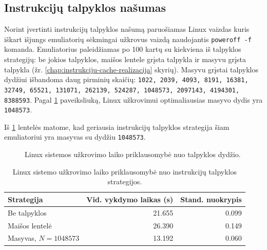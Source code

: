 \subsection{Instrukcijų talpyklos našumas}
\label{chap:cache-nasumas}

Norint įvertinti instrukcijų talpyklos našumą paruošiamas Linux vaizdas kuris iškart išjungs emuliatorių sėkmingai užkrovus vaizdą naudojantis \texttt{poweroff -f} komanda. Emuliatorius paleidžiamas po 100 kartų su kiekviena iš talpyklos strategijų: be jokios talpyklos, maišos lentele grįsta talpykla ir masyvu grįsta talpykla (žr. \ref{chap:instrukciju-cache-realizacija} skyrių). Masyvu grįstai talpyklos dydžiui išbandoma daug pirminių skaičių:
\texttt{1022, 2039, 4093, 8191, 16381, 32749, 65521, 131071, 262139, 524287, 1048573, 2097143, 4194301, 8388593}. Pagal \ref{fig:cache-dydis} paveiksliuką, Linux užkrovimui optimaliausias masyvo dydis yra \texttt{1048573}.

Iš \ref{tbl:instrukciju-cache} lentelės matome, kad geriausia instrukcijų talpyklos strategija šiam emuliatoriui yra masyvas su dydžiu \texttt{1048573}.

\begin{figure}[h]
    
    \caption{Linux sistemos užkrovimo laiko priklausomybė nuo talpyklos dydžio.}
    \label{fig:cache-dydis}
\end{figure}

\begin{table}[h]
\centering
\begin{tabular}{|l|r|r|}
  \hline
    \textbf{Strategija} & \textbf{Vid. vykdymo laikas (s)} & \textbf{Stand. nuokrypis}  \\

  \hline
Be talpyklos & 21.655 & 0.099 \\
\hline
Maišos lentelė & 26.390 & 0.149 \\
\hline
Masyvas, $N = 1048573$ & 13.192 & 0.060 \\
  \hline
\end{tabular}
    \caption{Linux sistemo užkrovimo laiko priklausomybė nuo instrukcijų talpyklos strategijos.}
    \label{tbl:instrukciju-cache}
\end{table}
